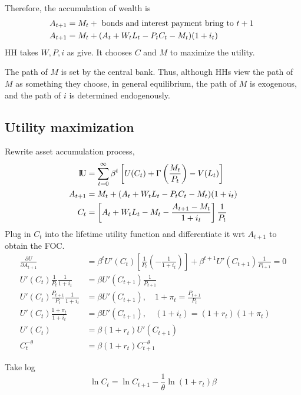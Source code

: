 \documentclass[12pt]{article}
\begin{document}
Therefore, the accumulation of wealth is
\begin{align*}
A_{t + 1} &= M_{t} + \text{ bonds and interest payment bring to $ t + 1 $ }\\
A_{t + 1}&= M_{t} + (A_{t} + W_{t}L_{t} - P_{t}C_{t} - M_{t})(1 + i_{t})
\end{align*}
HH takes $ W, P, i $ as give. It chooses $ C $ and $ M $ to maximize the utility.

The path of $ M $ is set by the central bank. Thus, although HHs view the path of $ M $
as something they choose, in general equilibrium, the path of $ M $ is exogenous,
and the path of $ i $ is determined endogenously.


\subsection{Utility maximization}
Rewrite asset accumulation process,
\begin{align*}
{\rm I\!{U}} &= \sum\limits_{t = 0} ^\infty \beta^{t}	\left[ 
		U(C_{t}) + \Gamma \left( \frac{M_{t}}{P_{t}} \right)  - V(L_{t})
\right] \\
A_{t + 1}&= M_{t} + (A_{t} + W_{t}L_{t} - P_{t}C_{t} - M_{t})(1 + i_{t})\\
C_{t}&= \left[ A_{t} + W_{t}L_{t} - M_{t} - \frac{A_{t + 1} - M_{t}}{1 + i_{t}} \right] 
\frac{1}{P_{t}}
\end{align*}
Plug in $ C_{t} $ into the lifetime utility function and differentiate it wrt 
$ A_{t + 1} $ to obtain the FOC.
\begin{align*}
\frac{\partial U }{\partial A_{t + 1} }&= 
\beta^{t}U'(C_{t})\left[ \frac{1}{P_{t}}\left(  - \frac{1}{1 + i_{t}} \right)  \right] 
 + \beta^{t + 1}U'(C_{t + 1})\frac{1}{P_{t + 1}} = 0\\
 U'(C_{t})\frac{1}{P_{t}}\frac{1}{1 + i_{t}} &= \beta U'(C_{t + 1})\frac{1}{P_{t + 1}}\\
 U'(C_{t})\frac{P_{t + 1}}{P_{t}}\frac{1}{1 + i_{t}}&= \beta U'(C_{t + 1}), \quad
 1 + \pi_{t} = \frac{P_{t + 1}}{P_{t}}\\
 U'(C_{t})\frac{1 + \pi_{t}}{1 + i_{t}}&= \beta U'(C_{t + 1}), \quad
 (1 + i_{t}) = (1 + r_{t})(1 + \pi_{t})\\
 U'(C_{t}) &= \beta(1 + r_{t})U'(C_{t + 1})\\
 C_{t}^{ - \theta}&= \beta(1 + r_{t})C_{t + 1}^{ - \theta}
\end{align*}

Take log
\begin{equation*}
\ln C_{t} = \ln C_{t + 1} - \frac{1}{\theta}\ln (1 + r_{t})\beta
\end{equation*}
\end{document}
